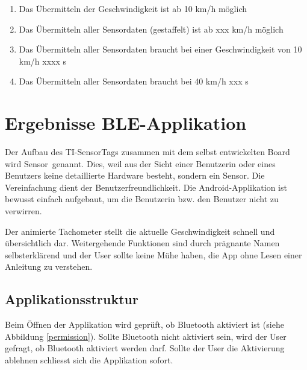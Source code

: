 \begin{enumerate}
    \item Das Übermitteln der Geschwindigkeit ist ab 10 km/h möglich
    \item Das Übermitteln aller Sensordaten (gestaffelt) ist ab xxx km/h möglich
    \item Das Übermitteln aller Sensordaten braucht bei einer Geschwindigkeit von 10 km/h xxxx s
    \item Das Übermitteln aller Sensordaten braucht bei 40 km/h xxx s
\end{enumerate}








\newpage
\section{Ergebnisse BLE-Applikation}

Der Aufbau des TI-SensorTags zusammen mit dem selbst entwickelten Board wird \glqq Sensor\grqq\thinspace\ genannt. Dies, weil aus der Sicht einer Benutzerin oder eines Benutzers keine detaillierte Hardware besteht, sondern \glqq ein Sensor\grqq. Die Vereinfachung dient der Benutzerfreundlichkeit. Die Android-Applikation ist bewusst einfach aufgebaut, um die Benutzerin bzw. den Benutzer nicht zu verwirren. 

Der animierte Tachometer stellt die aktuelle Geschwindigkeit schnell und übersichtlich dar. Weitergehende Funktionen sind durch prägnante Namen selbsterklärend und der User sollte keine Mühe haben, die App ohne Lesen einer Anleitung zu verstehen.

\subsection{Applikationsstruktur}

Beim Öffnen der Applikation wird geprüft, ob Bluetooth aktiviert ist (siehe Abbildung \ref{permission}). Sollte Bluetooth nicht aktiviert sein, wird der User gefragt, ob Bluetooth aktiviert werden darf. Sollte der User die Aktivierung ablehnen schliesst sich die Applikation sofort.

